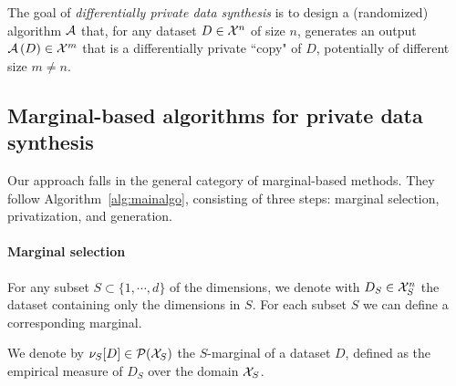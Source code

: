 The goal of \emph{differentially private data synthesis} is to design a (randomized) algorithm ${\mathcal{A}}$  that, for any dataset $D \in \mathcal X^n$ of size $n$, generates an output $\mathcal A\left(D\right) \in \mathcal X^m$ that is a differentially private ``copy" of $D$, potentially of different size $m \neq n$. 



\subsection{Marginal-based algorithms for private data synthesis }
\label{sec:marginal_based}
Our approach falls in the general category of marginal-based methods. They
 follow Algorithm~\ref{alg:mainalgo},  consisting of three steps: marginal selection, privatization, and generation.

\paragraph{Marginal selection} 
For any subset $S \subset \{1, \cdots, d\}$ of the dimensions,  we denote with $D_S \in \mathcal X_S^n$ the dataset containing only the dimensions in $S$. For each subset $S$ we can define a corresponding marginal.
\begin{definition}
\label{def:marginal}
    We denote by $\nu_{S}[D] \in \mathcal P(\mathcal X_S)$ the $S$-marginal of a dataset $D$, defined as the empirical measure of $D_S$ over the domain $\mathcal X_S$.
    \end{definition}

